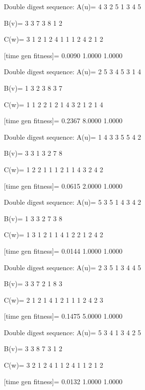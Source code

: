 Double digest sequence:
A(u)=
     4     3     2     5     1     3     4     5

B(v)=
     3     3     7     3     8     1     2

C(w)=
     3     1     2     1     2     4     1     1     1     2     4     2     1     2

[time gen fitness]=
    0.0090    1.0000    1.0000

Double digest sequence:
A(u)=
     2     5     3     4     5     3     1     4

B(v)=
     1     3     2     3     8     3     7

C(w)=
     1     1     2     2     1     2     1     4     3     2     1     2     1     4

[time gen fitness]=
    0.2367    8.0000    1.0000

Double digest sequence:
A(u)=
     1     4     3     3     5     5     4     2

B(v)=
     3     3     1     3     2     7     8

C(w)=
     1     2     2     1     1     1     2     1     1     4     3     2     4     2

[time gen fitness]=
    0.0615    2.0000    1.0000

Double digest sequence:
A(u)=
     5     3     5     1     4     3     4     2

B(v)=
     1     3     3     2     7     3     8

C(w)=
     1     3     1     2     1     1     4     1     2     2     1     2     4     2

[time gen fitness]=
    0.0144    1.0000    1.0000

Double digest sequence:
A(u)=
     2     3     5     1     3     4     4     5

B(v)=
     3     3     7     2     1     8     3

C(w)=
     2     1     2     1     4     1     2     1     1     1     2     4     2     3

[time gen fitness]=
    0.1475    5.0000    1.0000

Double digest sequence:
A(u)=
     5     3     4     1     3     4     2     5

B(v)=
     3     3     8     7     3     1     2

C(w)=
     3     2     1     2     4     1     1     2     4     1     1     2     1     2

[time gen fitness]=
    0.0132    1.0000    1.0000

